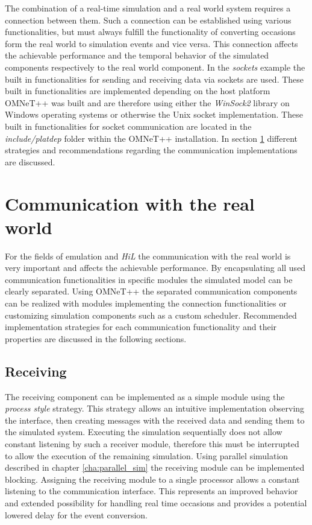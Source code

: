 The combination of a real-time simulation and a real world system requires a connection between them.
Such a connection can be established using various functionalities, but must always fulfill the functionality of converting occasions form the real world to simulation events and vice versa.
This connection affects the achievable performance and the temporal behavior of the simulated components respectively to the real world component.
In the \emph{sockets} example the built in functionalities for sending and receiving data via sockets are used.
These built in functionalities are implemented depending on the host platform OMNeT++ was built and are therefore using either the \emph{WinSock2} library on Windows operating systems or otherwise the Unix socket implementation.
These built in functionalities for socket communication are located in the \emph{include/platdep} folder within the OMNeT++ installation.
In section \ref{sec:emulation_communication} different strategies and recommendations regarding the communication implementations are discussed.

\section{Communication with the real world}
\label{sec:emulation_communication}
For the fields of emulation and \emph{HiL} the communication with the real world is very important and affects the achievable performance.
By encapsulating all used communication functionalities in specific modules the simulated model can be clearly separated.
Using OMNeT++ the separated communication components can be realized with modules implementing the connection functionalities or customizing simulation components such as a custom scheduler.
Recommended implementation strategies for each communication functionality and their properties are discussed in the following sections.

\subsection{Receiving}
\label{sec:emulation_communication_receiving}

The receiving component can be implemented as a simple module using the \emph{process style} strategy.
This strategy allows an intuitive implementation observing the interface, then creating messages with the received data and sending them to the simulated system.
Executing the simulation sequentially does not allow constant listening by such a receiver module, therefore this must be interrupted to allow the execution of the remaining simulation.
Using parallel simulation described in chapter \ref{cha:parallel_sim} the receiving module can be implemented blocking.
Assigning the receiving module to a single processor allows a constant listening to the communication interface.
This represents an improved behavior and extended possibility for handling real time occasions and provides a potential lowered delay for the event conversion.

